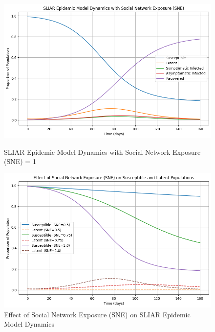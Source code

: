 \documentclass[9 pt]{article} %
\begin{document}
\begin{figure}[h]
    \centering
    \begin{minipage}[t]{0.45\textwidth}
        \centering
        \includegraphics[width=\linewidth]{Figures/anyalsis-3_sne_1.png}
        \caption{SLIAR Epidemic Model Dynamics with Social Network Exposure (SNE) = 1}
        \label{analysis_3_sne_1}
    \end{minipage}
    \hspace{0.05\textwidth}
    \begin{minipage}[t]{0.45\textwidth}
        \centering
        \includegraphics[width=\linewidth]{Figures/analysis_3_sne_chnage.png}
        \caption{Effect of Social Network Exposure (SNE) on SLIAR Epidemic Model Dynamics}
        \label{analysis_3_sne_change}
    \end{minipage}
\end{figure}
\end{document}
